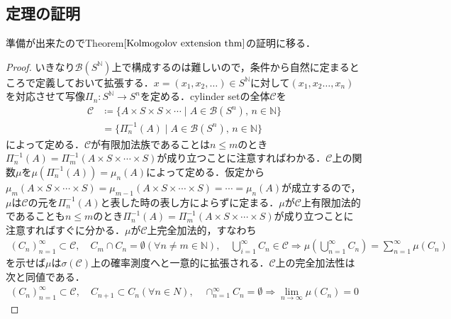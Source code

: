 \documentclass[dvipdfmx,autodetect-engine]{jsarticle}
\theoremstyle{remark}
\theoremstyle{definition}
\begin{document}
    \subsection{定理の証明}
    準備が出来たのでTheorem$\ref{Kolmogolov extension thm}$の証明に移る．
    \begin{proof}
    いきなり$\mathcal{B}(S^{\mathbb{N}})$上で構成するのは難しいので，条件から自然に定まるところで定義しておいて拡張する．$x=(x_1,x_2,\ldots) \in S^{\mathbb{N}}$に対して$(x_1,x_2\ldots,x_n)$を対応させて写像$\Pi_n:S^{\mathbb{N}} \to S^n$を定める．cylinder setの全体$\mathcal{C}$を
    \begin{align}
        \mathcal{C} &\coloneqq \{ A \times S\times S\times \cdots \mid A \in \mathcal{B}(S^n),\, n \in \mathbb{N} \} \\
        &= \{ \Pi_n^{-1}(A) \mid A \in \mathcal{B}(S^n),\, n \in \mathbb{N} \}
    \end{align}
    によって定める．$\mathcal{C}$が有限加法族であることは$n \leq m$のとき$\Pi_n^{-1} (A) = \Pi_m^{-1}(A\times S\times \cdots \times S)$が成り立つことに注意すればわかる．$\mathcal{C}$上の関数$\mu$を$\mu(\Pi_n^{-1}(A)) = \mu_n (A)$によって定める．仮定から$\mu_m(A\times S\times \cdots \times S)=\mu_{m-1}(A\times S\times \cdots \times S) = \cdots = \mu_n(A)$が成立するので，$\mu$は$\mathcal{C}$の元を$\Pi_n^{-1}(A)$と表した時の表し方によらずに定まる．$\mu$が$\mathcal{C}$上有限加法的であることも$n \leq m$のとき$\Pi_n^{-1} (A) = \Pi_m^{-1}(A\times S\times \cdots \times S)$が成り立つことに注意すればすぐに分かる．$\mu$が$\mathcal{C}$上完全加法的，すなわち
    \begin{align}
        (C_n)_{n=1}^{\infty} \subset \mathcal{C},\quad C_m \cap C_n = \emptyset  (\forall n\neq m \in \mathbb{N}),\quad \bigcup_{i=1}^{\infty} C_n \in \mathcal{C} \Rightarrow  \mu\left(\bigcup_{n=1}^{\infty} C_n\right) = \sum_{n=1}^{\infty} \mu(C_n)
    \end{align}
    を示せば$\mu$は$\sigma(\mathcal{C})$上の確率測度へと一意的に拡張される．$\mathcal{C}$上の完全加法性は次と同値である．
    \begin{align}
        (C_n)_{n=1}^{\infty} \subset \mathcal{C},\quad  C_{n+1} \subset C_n (\forall n \in N),\quad \cap_{n=1}^{\infty} C_n = \emptyset  \Rightarrow  \lim_{n\to \infty} \mu (C_n) = 0
    \end{align}

\end{proof}
\end{document}
